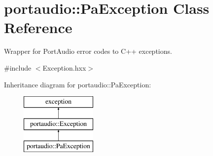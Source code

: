 \hypertarget{classportaudio_1_1_pa_exception}{}\section{portaudio\+:\+:Pa\+Exception Class Reference}
\label{classportaudio_1_1_pa_exception}


Wrapper for Port\+Audio error codes to C++ exceptions.  




{\ttfamily \#include $<$Exception.\+hxx$>$}

Inheritance diagram for portaudio\+:\+:Pa\+Exception\+:\begin{figure}[H]
\begin{center}
\leavevmode
\includegraphics[height=3.000000cm]{classportaudio_1_1_pa_exception}
\end{center}
\end{figure}
